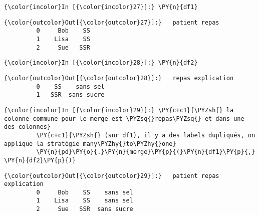     \begin{Verbatim}[commandchars=\\\{\},frame=single,framerule=0.3mm,rulecolor=\color{cellframecolor}]
{\color{incolor}In [{\color{incolor}27}]:} \PY{n}{df1}
\end{Verbatim}


\begin{Verbatim}[commandchars=\\\{\},frame=single,framerule=0.3mm,rulecolor=\color{cellframecolor}]
{\color{outcolor}Out[{\color{outcolor}27}]:}   patient repas
         0     Bob    SS
         1    Lisa    SS
         2     Sue   SSR
\end{Verbatim}
            
    \begin{Verbatim}[commandchars=\\\{\},frame=single,framerule=0.3mm,rulecolor=\color{cellframecolor}]
{\color{incolor}In [{\color{incolor}28}]:} \PY{n}{df2}
\end{Verbatim}


\begin{Verbatim}[commandchars=\\\{\},frame=single,framerule=0.3mm,rulecolor=\color{cellframecolor}]
{\color{outcolor}Out[{\color{outcolor}28}]:}   repas explication
         0    SS    sans sel
         1   SSR  sans sucre
\end{Verbatim}
            
    \begin{Verbatim}[commandchars=\\\{\},frame=single,framerule=0.3mm,rulecolor=\color{cellframecolor}]
{\color{incolor}In [{\color{incolor}29}]:} \PY{c+c1}{\PYZsh{} la colonne commune pour le merge est \PYZsq{}repas\PYZsq{} et dans une des colonnes}
         \PY{c+c1}{\PYZsh{} (sur df1), il y a des labels dupliqués, on applique la stratégie many\PYZhy{}to\PYZhy{}one}
         \PY{n}{pd}\PY{o}{.}\PY{n}{merge}\PY{p}{(}\PY{n}{df1}\PY{p}{,} \PY{n}{df2}\PY{p}{)}
\end{Verbatim}


\begin{Verbatim}[commandchars=\\\{\},frame=single,framerule=0.3mm,rulecolor=\color{cellframecolor}]
{\color{outcolor}Out[{\color{outcolor}29}]:}   patient repas explication
         0     Bob    SS    sans sel
         1    Lisa    SS    sans sel
         2     Sue   SSR  sans sucre
\end{Verbatim}
            
